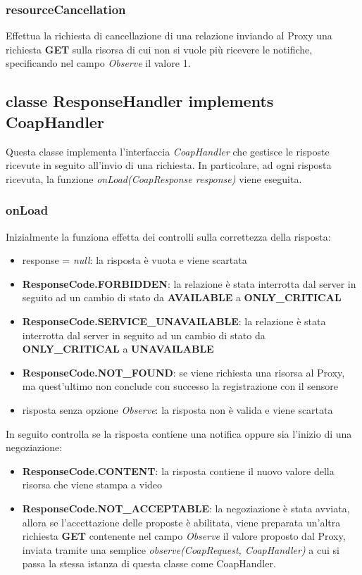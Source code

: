 			\subsubsection{resourceCancellation}
				Effettua la richiesta di cancellazione di una relazione inviando al Proxy una richiesta \textbf{GET} sulla risorsa di cui non si vuole più ricevere le notifiche, specificando nel campo \textit{Observe} il valore 1.
				

		\subsection{classe ResponseHandler implements CoapHandler}
			Questa classe implementa l'interfaccia \textit{CoapHandler} che gestisce le risposte ricevute in seguito all'invio di una richiesta. In particolare, ad ogni risposta ricevuta, la funzione \textit{onLoad(CoapResponse response)} viene eseguita.
			\subsubsection{onLoad}
				Inizialmente la funziona effetta dei controlli sulla correttezza della risposta:
				\begin{itemize}
					\item response = \textit{null}: la risposta è vuota e viene scartata
					\item \textbf{ResponseCode.FORBIDDEN}: la relazione è stata interrotta dal server in seguito ad un cambio di stato da \textbf{AVAILABLE} a \textbf{ONLY\_CRITICAL}
					\item \textbf{ResponseCode.SERVICE\_UNAVAILABLE}: la relazione è stata interrotta dal server in seguito ad un cambio di stato da 						\textbf{ONLY\_CRITICAL} a \textbf{UNAVAILABLE}
					\item \textbf{ResponseCode.NOT\_FOUND}: se viene richiesta una risorsa al Proxy, ma quest'ultimo non conclude con successo la registrazione con il sensore
					\item risposta senza opzione \textit{Observe}: la risposta non è valida e viene scartata
				\end{itemize}
				In seguito controlla se la risposta contiene una notifica oppure sia l'inizio di una negoziazione:
				\begin{itemize}
					\item \textbf{ResponseCode.CONTENT}: la risposta contiene il nuovo valore della risorsa che viene stampa a video
					\item \textbf{ResponseCode.NOT\_ACCEPTABLE}: la negoziazione è stata avviata, allora se l'accettazione delle proposte è abilitata, viene preparata un'altra richiesta \textbf{GET} contenente nel campo \textit{Observe} il valore proposto dal Proxy, inviata tramite una semplice \textit{observe(CoapRequest, CoapHandler)} a cui si passa la stessa istanza di questa classe come CoapHandler.
				\end{itemize}
